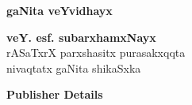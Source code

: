 \thispagestyle{empty}
\begin{center}
{\Huge\bfseries gaNita veYvidhayx}
\vfill


{\LARGE\bfseries veY. esf. subarxhamxNayx}\\[4pt]
{\large rASaTxrX parxshasitx purasakxqqta\\[4pt]
nivaqtatx gaNita shikaSxka}
\vfill

{\Large\rm\bfseries Publisher Details}





\end{center}
